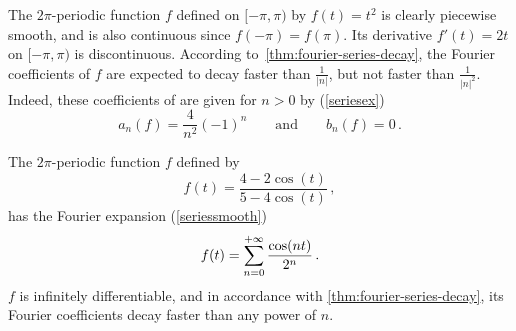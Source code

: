 \begin{example}
	The $2\pi$-periodic function $f$ defined on $[-\pi,\pi)$ by $f(t)=t^2$ is clearly
	piecewise smooth, and is also continuous since $f(-\pi)=f(\pi)$. Its derivative
	$f'(t)=2t$ on $[-\pi,\pi)$ is discontinuous. According
	to~\cref{thm:fourier-series-decay}, the Fourier coefficients of $f$ are expected to
	decay faster than $\frac{1}{|n|}$, but not faster than $\frac{1}{|n|^2 }$. Indeed, these
	coefficients of are given for $n>0$ by (\cf\cref{seriesex})
	\begin{equation}
		a_n(f)=\frac{4}{n^2}(-1)^n\qquad\text{and}\qquad b_n(f)=0\,.
	\end{equation}
\end{example}
\begin{example}
	The $2\pi$-periodic function $f$ defined by
	\begin{equation}
		f(t)=\frac{4-2\cos(t)}{5-4\cos(t)}\,,
	\end{equation}
	has the Fourier expansion (\cf\cref{seriessmooth})
	\begin{equation}
		f(t)=\sum_{n=0}^{+\infty}\frac{\cos(nt)}{2^n}\,.
	\end{equation}
	$f$ is infinitely differentiable, and in accordance with
	\cref{thm:fourier-series-decay}, its Fourier coefficients decay faster than any power of
	$n$.
\end{example}
